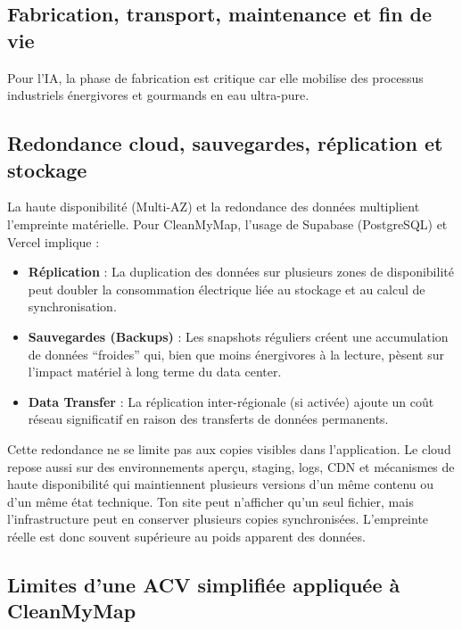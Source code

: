 \documentclass[
  10pt,
  a4paper,
  DIV=11,
  numbers=noendperiod,
  oneside]{scrreprt}
\providecommand{\tightlist}{%
  \setlength{\itemsep}{0pt}\setlength{\parskip}{0pt}}
\let\oldtextbf\textbf
\renewcommand{\textbf}[1]{\oldtextbf{\textcolor{cmmnavy}{#1}}}
\begin{document}
\subsection{Fabrication, transport, maintenance et fin de
vie}\label{fabrication-transport-maintenance-et-fin-de-vie}

Pour l'IA, la phase de fabrication est critique car elle mobilise des
processus industriels énergivores et gourmands en eau ultra-pure.

\subsection{Redondance cloud, sauvegardes, réplication et
stockage}\label{redondance-cloud-sauvegardes-ruxe9plication-et-stockage}

La haute disponibilité (Multi-AZ) et la redondance des données
multiplient l'empreinte matérielle. Pour CleanMyMap, l'usage de Supabase
(PostgreSQL) et Vercel implique :

\begin{itemize}
\tightlist
\item
  \textbf{Réplication} : La duplication des données sur plusieurs zones
  de disponibilité peut doubler la consommation électrique liée au
  stockage et au calcul de synchronisation.
\item
  \textbf{Sauvegardes (Backups)} : Les snapshots réguliers créent une
  accumulation de données ``froides'' qui, bien que moins énergivores à
  la lecture, pèsent sur l'impact matériel à long terme du data center.
\item
  \textbf{Data Transfer} : La réplication inter-régionale (si activée)
  ajoute un coût réseau significatif en raison des transferts de données
  permanents.
\end{itemize}

Cette redondance ne se limite pas aux copies visibles dans
l'application. Le cloud repose aussi sur des environnements aperçu,
staging, logs, CDN et mécanismes de haute disponibilité qui maintiennent
plusieurs versions d'un même contenu ou d'un même état technique. Ton
site peut n'afficher qu'un seul fichier, mais l'infrastructure peut en
conserver plusieurs copies synchronisées. L'empreinte réelle est donc
souvent supérieure au poids apparent des données.

\subsection{Limites d'une ACV simplifiée appliquée à
CleanMyMap}\label{limites-dune-acv-simplifiuxe9e-appliquuxe9e-uxe0-cleanmymap}
\end{document}
